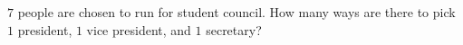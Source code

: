 $7$ people are chosen to run for student council. How many ways are there to pick $1$ president, $1$ vice president, and $1$ secretary?
